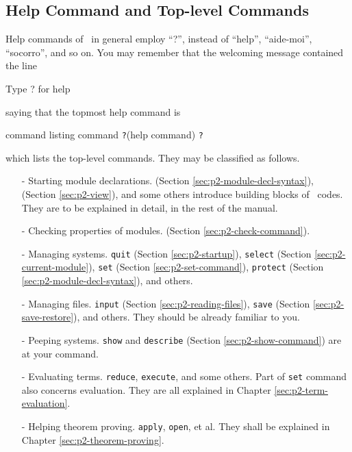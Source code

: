 \documentclass[a4paper]{memoir}
\begin{document}
\subsection{Help Command and Top-level Commands}\label{sec:p2-help-command}

Help commands of \cafeobj~in general employ ``?'', instead of
``help'', ``aide-moi'', ``socorro'', and so on. You may remember that
the welcoming message contained the line
\begin{vvtm}
\begin{ccode}
                              Type ? for help
\end{ccode}
\end{vvtm}
saying that the topmost help command is

\begin{bsyntax} command listing command \texttt{?}(help command)\Hline
\texttt{?}
\end{bsyntax}

which lists the top-level commands. They may be classified as follows.
\begin{itemize}
\item[-] Starting module declarations. 
 (Section \ref{sec:p2-module-decl-syntax}), 
 (Section \ref{sec:p2-view}), and some others introduce building
 blocks of \cafeobj~codes. They are to be explained in detail, in the rest of
 the manual.
\item[-] Checking properties of modules. 
 (Section \ref{sec:p2-check-command}).
\item[-] Managing systems. \verb|quit| (Section \ref{sec:p2-startup}),
 \verb|select| (Section \ref{sec:p2-current-module}),
 \verb|set| (Section \ref{sec:p2-set-command}),
 \verb|protect| (Section \ref{sec:p2-module-decl-syntax}), and others.
\item[-] Managing files. \verb|input| (Section \ref{sec:p2-reading-files}),
 \verb|save| (Section \ref{sec:p2-save-restore}), and others. They
  should be already familiar to you.
\item[-] Peeping systems. \verb|show| and \verb|describe|
 (Section \ref{sec:p2-show-command}) are at your command.
\item[-] Evaluating terms. \verb|reduce|,
 \verb|execute|, and some others. Part of
 \verb|set| command also concerns evaluation. They are all explained in
  Chapter \ref{sec:p2-term-evaluation}.
\item[-] Helping theorem proving. \verb|apply|, \verb|open|, et al. They
 shall be explained in Chapter \ref{sec:p2-theorem-proving}.
\end{itemize}
\end{document}
